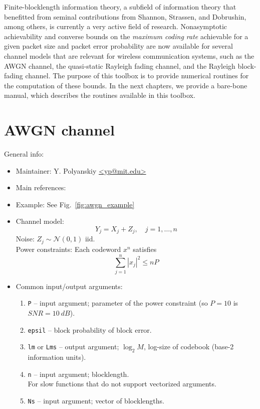 \documentclass[a4paper,11p]{memoir}
\def\matn{\mathcal{N}}
\begin{document}
Finite-blocklength information theory, a subfield of information theory that benefitted from seminal contributions from Shannon, Strassen, and Dobrushin, among others, is currently a very active field of research. 
Nonasymptotic achievability and converse bounds on the \emph{maximum coding rate} achievable for a given packet size and packet error probability are now available for several channel models that are relevant for wireless communication systems, such as the AWGN channel, the quasi-static Rayleigh fading channel, and the Rayleigh block-fading channel.
The purpose of this toolbox is to provide numerical routines for the computation of these bounds.
In the next chapters, we provide a bare-bone manual, which describes the routines available in this toolbox.



\chapter{AWGN channel}


General info:
\begin{itemize}
\item Maintainer: Y. Polyanskiy \url{<yp@mit.edu>}

\item Main references: \cite{PPV08,PPV10eneff}

\item Example: See Fig.~\ref{fig:awgn_example} 

\item Channel model:
	$$ Y_j = X_j + Z_j, \quad j=1,\ldots,n $$
	Noise: $Z_j \sim \matn(0,1)$ iid.\\
	Power constraints: Each codeword $x^n$ satisfies
			$$ \sum_{j=1}^n |x_j|^2 \le n P $$

\item Common input/output arguments:
\begin{enumerate}
\item \verb|P| -- input argument; parameter of the power constraint (so $P=10$ is $SNR=10~dB$).
\item \verb|epsil| -- block probability of block error.
\item \verb|lm| or \verb|Lms| -- output argument; $\log_2 M$, log-size of codebook (base-2 information units). 
\item \verb|n| -- input argument; blocklength.\\
		For slow functions that do not support vectorized arguments.
\item \verb|Ns| -- input argument; vector of blocklengths.
\end{enumerate}
\end{itemize}
\end{document}
